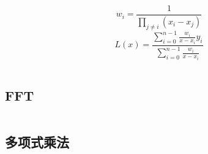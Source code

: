 \documentclass[utf8]{ctexart}
\newcommand{\cpp}[1]{\inputminted[linenos,breaklines,tabsize=4,mathescape]{c++}{#1}}
\begin{document}
$$w_i = \frac{1}{\prod_{j \ne i}(x_i - x_j)}$$
$$L(x) = \frac{\sum_{i=0}^{n-1}\frac{w_i}{x-x_i}y_i}{\sum_{i=0}^{n-1}\frac{w_i}{x-x_i}}$$

\cpp{codes/math/polynomial/lagrange-weight.cpp}

\subsection{FFT}

\cpp{codes/math/polynomial/fft.cpp}

\subsection{多项式乘法}

\cpp{codes/math/polynomial/polynomial-multiply.cpp}


\end{document}

